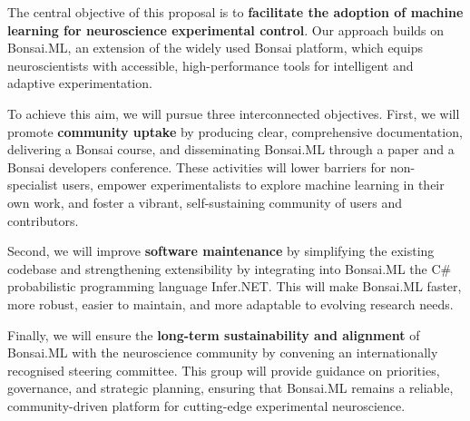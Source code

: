 The central objective of this proposal is to \textbf{facilitate the adoption of
machine learning for neuroscience experimental control}. Our approach builds on
Bonsai.ML, an extension of the widely used Bonsai platform, which
equips neuroscientists with accessible, high-performance tools for intelligent
and adaptive experimentation.

To achieve this aim, we will pursue three interconnected objectives. First, we
will promote \textbf{community uptake} by producing clear, comprehensive
documentation, delivering a Bonsai course, and disseminating Bonsai.ML through
a paper and a Bonsai developers conference. These activities will lower
barriers for non-specialist users, empower experimentalists to explore machine
learning in their own work, and foster a vibrant, self-sustaining community of
users and contributors.

Second, we will improve \textbf{software maintenance} by simplifying the
existing codebase and strengthening extensibility by integrating into Bonsai.ML
the C\# probabilistic programming language Infer.NET.  This will make Bonsai.ML
faster, more robust, easier to maintain, and more adaptable to evolving
research needs.  

Finally, we will ensure the \textbf{long-term sustainability and alignment} of
Bonsai.ML with the neuroscience community by convening an internationally
recognised steering committee. This group will provide guidance on priorities,
governance, and strategic planning, ensuring that Bonsai.ML remains a reliable,
community-driven platform for cutting-edge experimental neuroscience.  

